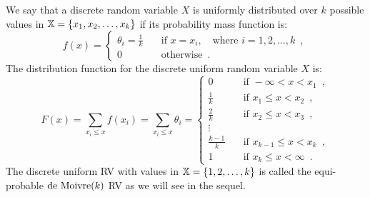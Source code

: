 \begin{framed}
\begin{model}{\label{Df:DiscreteUniformRV}
We say that a discrete random variable $X$ is uniformly distributed over $k$ possible values in $\mathbb{X}=\{x_1,x_2,\ldots,x_k\}$ if its probability mass function is:
\begin{equation}\label{E:DiscreteUniformPMF}
f(x) =
\begin{cases}
\theta_i = \frac{1}{k} &  \quad\textrm{if } x=x_i, \quad\textrm{where } i=1,2, \ldots ,k \enspace, \\
0 & \quad\textrm{otherwise}\enspace.
\end{cases}
\end{equation}
The distribution function for the discrete uniform random variable $X$ is:
\begin{equation}\label{E:DiscreteUniformDF}
F(x) = \sum_{x_i\leq x} f(x_i) = \sum_{x_i\leq x} \theta_i =
\begin{cases}
0 &\quad \textrm{if }-\infty < x < x_1\enspace ,\\
\frac{1}{k}  & \quad \textrm{if }x_1 \leq x < x_2\enspace , \\
\frac{2}{k}  & \quad \textrm{if }x_2 \leq x < x_3\enspace , \\
\vdots & \\
\frac{k-1}{k}  & \quad \textrm{if }x_{k-1} \leq x < x_k\enspace , \\
1 & \quad \textrm{if }x_k \leq x < \infty\enspace .
\end{cases}
\end{equation}
}
The discrete uniform RV with values in $\mathbb{X} = \{1,2,\ldots,k\}$ is called the equi-probable $\mbox{{\rm de~Moivre}}(k)$ RV as we will see in the sequel. 
\end{model}
\end{framed}

